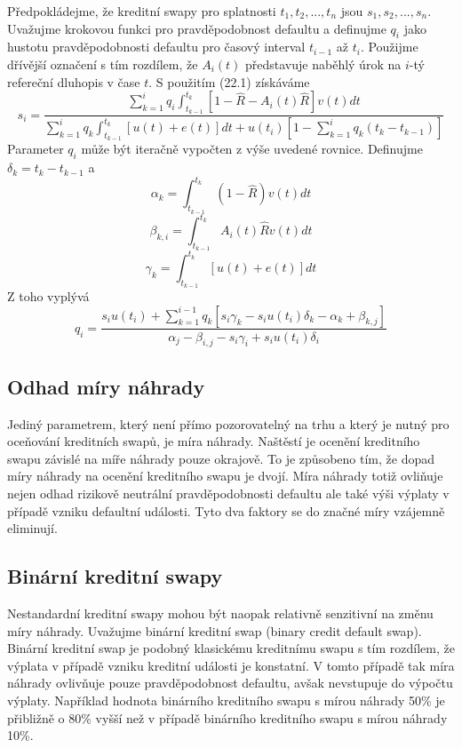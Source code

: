 \documentclass[a4paper]{book}
\begin{document}
Předpokládejme, že kreditní swapy pro splatnosti $t_1, t_2, ..., t_n$ jsou $s_1, s_2, ..., s_n$. Uvažujme krokovou funkci pro pravděpodobnost defaultu a definujme $q_i$ jako hustotu pravděpodobnosti defaultu pro časový interval $t_{i-1}$ až $t_i$. Použijme dřívější označení s tím rozdílem, že $A_i(t)$ představuje naběhlý úrok na $i$-tý refereční dluhopis v čase $t$. S použitím (22.1) získáváme
\begin{equation*}
s_i = \frac{\sum^i_{k = 1} q_i \int^{t_k}_{t_{k-1}}[1 - \hat{R} - A_i(t)\hat{R}]v(t)dt}{\sum^i_{k=1}q_k \int^{t_k}_{t_{k-1}}[u(t) + e(t)]dt + u(t_i)[1 - \sum^i_{k=1}q_k(t_k - t_{k-1})]}
\end{equation*}
Parameter $q_i$ může být iteračně vypočten z výše uvedené rovnice. Definujme $\delta_k = t_k - t_{k-1}$ a
\begin{equation*}
\alpha_k = \int^{t_k}_{t_{k-1}} (1 - \hat{R})v(t)dt
\end{equation*}
\begin{equation*}
\beta_{k,i} = \int^{t_k}_{t_{k-1}} A_i(t) \hat{R} v(t) dt
\end{equation*}
\begin{equation*}
\gamma_{k} = \int^{t_k}_{t_{k-1}} [u(t) + e(t)]dt
\end{equation*}
Z toho vyplývá
\begin{equation*}
q_i = \frac{s_i u(t_i) + \sum^{i-1}_{k=1} q_k [s_i \gamma_k - s_i u(t_i) \delta_k - \alpha_k + \beta_{k,j}]}{\alpha_j - \beta_{i,j} - s_i \gamma_i + s_i u(t_i) \delta_i}
\end{equation*}

\subsection{Odhad míry náhrady}
Jediný parametrem, který není přímo pozorovatelný na trhu a který je nutný pro oceňování kreditních swapů, je míra náhrady. Naštěstí je ocenění kreditního swapu závislé na míře náhrady pouze okrajově. To je způsobeno tím, že dopad míry náhrady na ocenění kreditního swapu je dvojí. Míra náhrady totiž ovliňuje nejen odhad rizikově neutrální pravděpodobnosti defaultu ale také výši výplaty v případě vzniku defaultní události. Tyto dva faktory se do značné míry vzájemně eliminují.

\subsection{Binární kreditní swapy}

Nestandardní kreditní swapy mohou být naopak relativně senzitivní na změnu míry náhrady. Uvažujme binární kreditní swap (binary credit default swap). Binární kreditní swap je podobný klasickému kreditnímu swapu s tím rozdílem, že výplata v případě vzniku kreditní události je konstatní. V tomto případě tak míra náhrady ovlivňuje pouze pravděpodobnost defaultu, avšak nevstupuje do výpočtu výplaty. Například hodnota binárního kreditního swapu s mírou náhrady 50\% je přibližně o 80\% vyšší než v případě binárního kreditního swapu s mírou náhrady 10\%.
\end{document}
